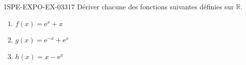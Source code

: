 \begin{exercice}{1SPE-EXPO-EX-033}{1}{7}
Dériver chacune des fonctions suivantes définies sur $\mathbb{R}$.
\begin{enumerate}
\item $f(x) = \mathrm{e}^{x} + x$
\item $g(x) = \mathrm{e}^{-x} + \mathrm{e}^{x}$
\item $h(x) = x - \mathrm{e}^{x}$
\end{enumerate}
\end{exercice}
